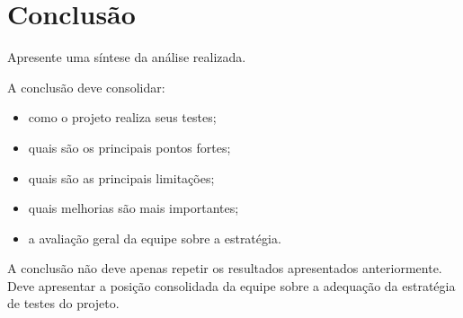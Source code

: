 \section{Conclusão}

Apresente uma síntese da análise realizada.

A conclusão deve consolidar:

\begin{itemize}
    \item como o projeto realiza seus testes;
    \item quais são os principais pontos fortes;
    \item quais são as principais limitações;
    \item quais melhorias são mais importantes;
    \item a avaliação geral da equipe sobre a estratégia.
\end{itemize}

A conclusão não deve apenas repetir os resultados apresentados
anteriormente. Deve apresentar a posição consolidada da equipe
sobre a adequação da estratégia de testes do projeto.
